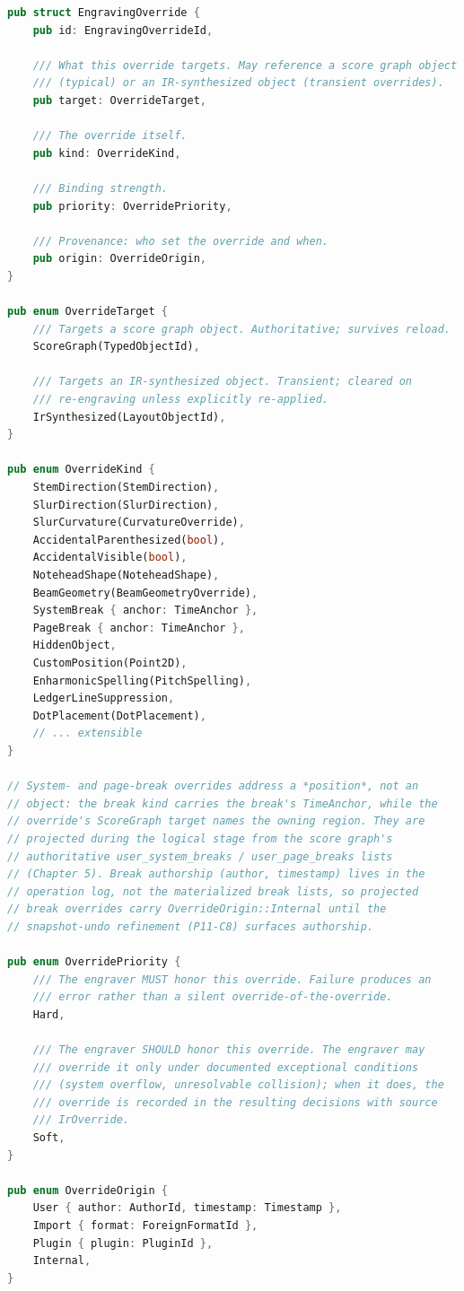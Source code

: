 \documentclass[11pt,letterpaper]{report}
\begin{document}
\begin{lstlisting}[language=Rust]
pub struct EngravingOverride {
    pub id: EngravingOverrideId,

    /// What this override targets. May reference a score graph object
    /// (typical) or an IR-synthesized object (transient overrides).
    pub target: OverrideTarget,

    /// The override itself.
    pub kind: OverrideKind,

    /// Binding strength.
    pub priority: OverridePriority,

    /// Provenance: who set the override and when.
    pub origin: OverrideOrigin,
}

pub enum OverrideTarget {
    /// Targets a score graph object. Authoritative; survives reload.
    ScoreGraph(TypedObjectId),

    /// Targets an IR-synthesized object. Transient; cleared on
    /// re-engraving unless explicitly re-applied.
    IrSynthesized(LayoutObjectId),
}

pub enum OverrideKind {
    StemDirection(StemDirection),
    SlurDirection(SlurDirection),
    SlurCurvature(CurvatureOverride),
    AccidentalParenthesized(bool),
    AccidentalVisible(bool),
    NoteheadShape(NoteheadShape),
    BeamGeometry(BeamGeometryOverride),
    SystemBreak { anchor: TimeAnchor },
    PageBreak { anchor: TimeAnchor },
    HiddenObject,
    CustomPosition(Point2D),
    EnharmonicSpelling(PitchSpelling),
    LedgerLineSuppression,
    DotPlacement(DotPlacement),
    // ... extensible
}

// System- and page-break overrides address a *position*, not an
// object: the break kind carries the break's TimeAnchor, while the
// override's ScoreGraph target names the owning region. They are
// projected during the logical stage from the score graph's
// authoritative user_system_breaks / user_page_breaks lists
// (Chapter 5). Break authorship (author, timestamp) lives in the
// operation log, not the materialized break lists, so projected
// break overrides carry OverrideOrigin::Internal until the
// snapshot-undo refinement (P11-C8) surfaces authorship.

pub enum OverridePriority {
    /// The engraver MUST honor this override. Failure produces an
    /// error rather than a silent override-of-the-override.
    Hard,

    /// The engraver SHOULD honor this override. The engraver may
    /// override it only under documented exceptional conditions
    /// (system overflow, unresolvable collision); when it does, the
    /// override is recorded in the resulting decisions with source
    /// IrOverride.
    Soft,
}

pub enum OverrideOrigin {
    User { author: AuthorId, timestamp: Timestamp },
    Import { format: ForeignFormatId },
    Plugin { plugin: PluginId },
    Internal,
}
\end{lstlisting}
\end{document}
